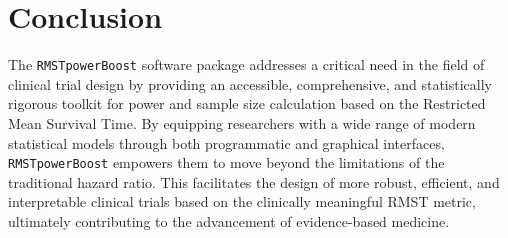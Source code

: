 \documentclass[11pt, a4paper]{article}
\begin{document}
\section{Conclusion}
The \texttt{RMSTpowerBoost} software package addresses a critical need in the field of clinical trial design by providing an accessible, comprehensive, and statistically rigorous toolkit for power and sample size calculation based on the Restricted Mean Survival Time. By equipping researchers with a wide range of modern statistical models through both programmatic and graphical interfaces, \texttt{RMSTpowerBoost} empowers them to move beyond the limitations of the traditional hazard ratio. This facilitates the design of more robust, efficient, and interpretable clinical trials based on the clinically meaningful RMST metric, ultimately contributing to the advancement of evidence-based medicine.


\end{document}

